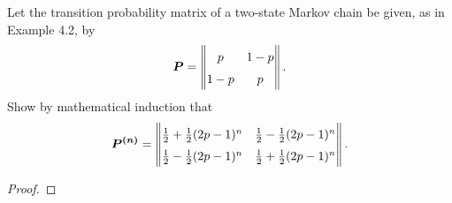 \begin{problem}{4.6}
  Let the transition probability matrix of a two-state Markov chain be given, as in
  Example 4.2, by
  \begin{align*}
    \renewcommand\arraystretch{1.5}
    \boldsymbol{P} =
    \begin{Vmatrix}
      p    & 1-p \\
      1-p  & p   \\
    \end{Vmatrix}.
  \end{align*}
  Show by mathematical induction that
  \begin{align*}
    \renewcommand\arraystretch{1.5}
    \boldsymbol{P^{(n)}} =
    \begin{Vmatrix}
      \frac{1}{2} + \frac{1}{2}(2p - 1)^n & \frac{1}{2} - \frac{1}{2}(2p - 1)^n  \\
      \frac{1}{2} - \frac{1}{2}(2p - 1)^n & \frac{1}{2} + \frac{1}{2}(2p - 1)^n \\
    \end{Vmatrix}.
  \end{align*}
\end{problem}

\begin{proof}
\end{proof}
\newpage

